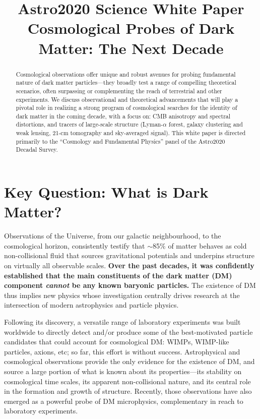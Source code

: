 \documentclass[12pt]{article}
\title{\textbf{Astro2020 Science White Paper}\\
\vspace{0.5cm}
Cosmological Probes of Dark Matter: The Next Decade}
\date{}
\author{}
\begin{document}
\maketitle

\begin{abstract}
Cosmological observations offer unique and robust avenues for probing fundamental nature of dark matter particles---they broadly test a range of compelling theoretical scenarios, often surpassing or complementing the reach of terrestrial and other experiments.
We discuss observational and theoretical advancements that will play a pivotal role in realizing a strong program of cosmological searches for the identity of dark matter in the coming decade, with a focus on: CMB anisotropy and spectral distortions, and tracers of large-scale structure (Lyman-$\alpha$ forest, galaxy clustering and weak lensing, 21-cm tomography and sky-averaged signal).
This white paper is directed primarily to the ``Cosmology and Fundamental Physics'' panel of the Astro2020 Decadal Survey.  

\end{abstract}

\pagebreak
\section{Key Question: What is Dark Matter?}
 
Observations of the Universe, from our galactic neighbourhood, to the cosmological horizon, consistently testify that $\sim$85$\%$ of matter behaves as cold non-collisional fluid that sources gravitational potentials and underpins structure on virtually all observable scales.
\textbf{Over the past decades, it was confidently established that the main constituents of the dark matter (DM) component \textit{cannot} be any known baryonic particles.}
The existence of DM thus implies new physics whose investigation centrally drives research at the intersection of modern astrophysics and particle physics. 

Following its discovery, a versatile range of laboratory experiments was built worldwide to directly detect and/or produce some of the best-motivated particle candidates that could account for cosmological DM: WIMPs, WIMP-like particles, axions, etc; so far, this effort is without success.
Astrophysical and cosmological observations provide the only evidence for the existence of DM, and source a large portion of what is known about its properties---its stability on cosmological time scales, its apparent non-collisional nature, and its central role in the formation and growth of structure.
Recently, those observations have also emerged as a powerful probe of DM microphysics, complementary in reach to laboratory experiments.
\end{document}
